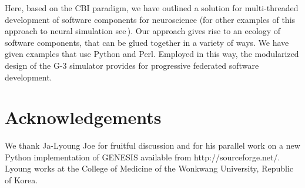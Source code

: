 \documentclass[12pt]{article}
\begin{document}
Here, based on the CBI paradigm, we have outlined a solution for
multi-threaded development of software components for neuroscience
(for other examples of this approach to neural simulation
see\,\cite{schuermann09:_neuron, nordlie09:_visual}).  Our approach
gives rise to an ecology of software components, that can be glued
together in a variety of ways.  We have given examples that use Python
and Perl.
Employed in this way, the modularized design of the G-3 simulator
provides for progressive federated software development.







\section*{Acknowledgements}
We thank Ja-Lyoung Joe for fruitful discussion and for his parallel
work on a new Python implementation of GENESIS available from
http://sourceforge.net/.  Lyoung works at the College of Medicine of
the Wonkwang University, Republic of Korea.


\cleardoublepage
{}

%
%


\end{document}
